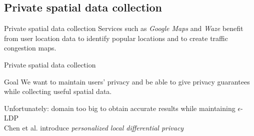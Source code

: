 \documentclass[aspectratio=43]{beamer}
\begin{document}



\subsection{Private spatial data collection}

\begin{frame}{Private spatial data collection}
    Services such as \emph{Google Maps} and \emph{Waze} benefit from user location data to identify popular locations and to create traffic congestion maps.
\end{frame}


\begin{frame}{Private spatial data collection}
    \begin{alertblock}{Goal}
        We want to maintain users' privacy and be able to give privacy guarantees while collecting useful spatial data.
    \end{alertblock}
    \bigskip
    Unfortunately: domain too big to obtain accurate results while maintaining $\epsilon$-LDP\\
    \bigskip
    Chen et al. introduce \emph{personalized local differential privacy}
\end{frame}

\end{document}
